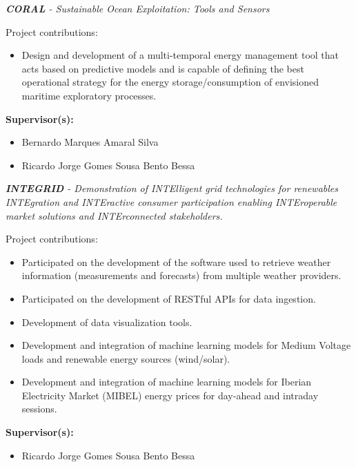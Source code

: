 \documentclass{mycv}
\begin{document}
\begin{myitemize}
	\item \textit{\textbf{CORAL} - Sustainable Ocean Exploitation: Tools and Sensors}
	\vspace{0.2cm}
	
	Project contributions:
	\begin{itemize}[itemsep=1px]

	\item Design and development of a multi-temporal energy management tool that acts based on predictive models and is capable of defining the best operational strategy for the energy storage/consumption of envisioned maritime exploratory processes.
	\end{itemize}
	\vspace{0.2cm}
	
	\textbf{Supervisor(s):}
	\begin{itemize}
		\item Bernardo Marques Amaral Silva
		\item Ricardo Jorge Gomes Sousa Bento Bessa
	\end{itemize}
		
	\vspace{0.4cm}
	
	\item \textit{\textbf{INTEGRID} - Demonstration of INTElligent grid technologies for renewables INTEgration and INTEractive consumer participation enabling INTEroperable market solutions and INTErconnected stakeholders.}
	\vspace{0.2cm}
	
	Project contributions:
	\begin{itemize}[itemsep=1px]
	\item Participated on the development of the software used to retrieve weather information (measurements and forecasts) from multiple weather providers.
	\item Participated on the development of RESTful APIs for data ingestion.
	\item Development of data visualization tools.
	\item Development and integration of machine learning models for Medium Voltage loads and renewable energy sources (wind/solar).
	\item Development and integration of machine learning models for Iberian Electricity Market (MIBEL) energy prices for day-ahead and intraday sessions.
	\end{itemize}	
	
	\vspace{0.2cm}
	
	\textbf{Supervisor(s):}
	\begin{itemize}
		\item Ricardo Jorge Gomes Sousa Bento Bessa
	\end{itemize}
		
\end{myitemize}
\end{document}
